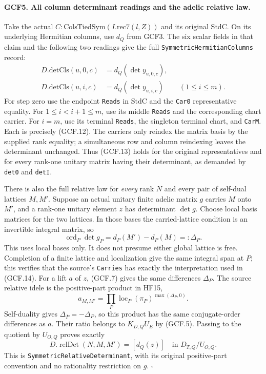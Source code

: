 \documentclass[11pt,a4paper]{article}
\numberwithin{equation}{section}
\theoremstyle{remark}\newtheorem{remark}[theorem]{Remark}
\begin{document}
\paragraph{GCF5. All column determinant readings and the adelic relative law.}
\label{claim:GCF5}
Take the actual \(C:\mathrm{ColsTiedSym}(I.\mathrm{rec7}(l,Z))\)
and its original \(\mathrm{StdC}\).  On its underlying Hermitian
columns, use \(d_Q\) from GCF3.  The six scalar fields in that claim
and the following two readings give the full
\texttt{Symmetric\allowbreak Hermitian\allowbreak Columns} record:
\[
 \begin{aligned}
 D.\mathrm{detCls}(u,0,c)&=d_Q(\det y_{u,0,c}),\\
 D.\mathrm{detCls}(u,i,c)&=d_Q(\det y_{u,i,c})
                                  &&(1\le i\le m).
 \end{aligned}                                                   \tag{GCF.13}
\]
For step zero use the endpoint \texttt{Reads} in \(\mathrm{StdC}\)
and the \texttt{Car0} representative equality.  For
\(1\le i<i+1\le m\), use its middle \texttt{Reads} and the
corresponding chart carrier.  For \(i=m\), use its terminal
\texttt{Reads}, the singleton terminal chart, and \texttt{Car\allowbreak M}.
Each is precisely (GCF.12).  The carriers only reindex the matrix
basis by the supplied rank equality; a simultaneous row and column
reindexing leaves the determinant unchanged.  Thus (GCF.13) holds for
the original representatives and for every rank-one unitary matrix
having their determinant, as demanded by \texttt{det0} and
\texttt{det\allowbreak I}.

There is also the full relative law for \emph{every} rank \(N\) and
every pair of self-dual lattices \(M,M'\).  Suppose an actual unitary
finite adelic matrix \(g\) carries \(M\) onto \(M'\), and a
rank-one unitary element \(z\) has determinant \(\det g\).  Choose
local basis matrices for the two lattices.  In those bases the
carried-lattice condition is an invertible integral matrix, so
\[
 \operatorname{ord}_P\det g_P=d_P(M')-d_P(M)=:\Delta_P.
 \tag{GCF.14}
\]
This uses local bases only.  It does not presume either global lattice
is free.  Completion of a finite lattice and localization give the
same integral span at \(P\); this verifies that the source's
\texttt{Carries} has exactly the interpretation used in (GCF.14).
For a lift \(a\) of \(z\), (GCF.7) gives the same differences
\(\Delta_P\).  The source relative idele is the positive-part
product in HF15,
\[
              a_{M,M'}=\prod_P
                  \operatorname{loc}_P(\pi_P)^{\max(\Delta_P,0)}.
\]
Self-duality gives \(\Delta_{\bar P}=-\Delta_P\), so this product
has the same conjugate-order differences as \(a\).
Their ratio belongs to \(K_{D,Q}U_E\) by (GCF.5).  Passing to the
quotient by \(U_{O,Q}\) proves exactly
\[
       D.\operatorname{relDet}(N,M,M')=[d_Q(z)]
                                  \quad\text{in }D_{T,Q}/U_{O,Q}.
 \tag{GCF.15}
\]
This is \texttt{Symmetric\allowbreak Relative\allowbreak Determinant}, with its original
positive-part convention and no rationality restriction on \(g\).
\hfill\(\square\)
\end{document}
